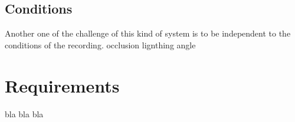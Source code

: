 \subsection{Conditions}

\vspace{\baselineskip}
\noindent Another one of the challenge of this kind of system is to be independent to the conditions of the recording.
occlusion
lignthing
angle
\newline

\section{Requirements}

\vspace{\baselineskip}
\noindent bla bla bla
\newline



